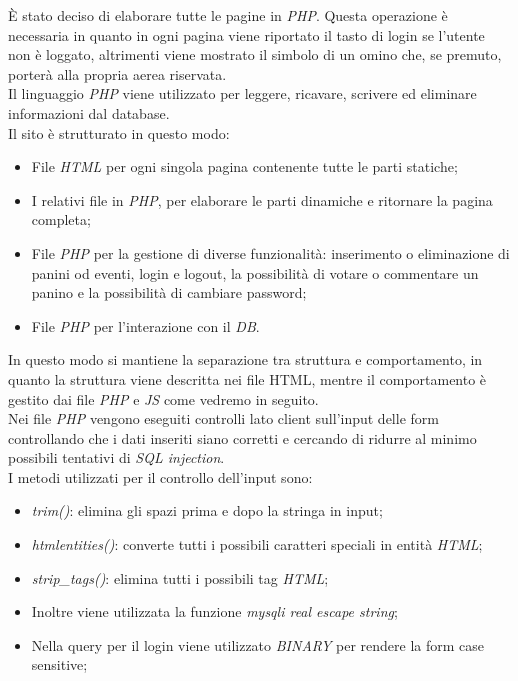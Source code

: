 È stato deciso di elaborare tutte le pagine in \emph{PHP}. 
Questa operazione è necessaria in quanto in ogni 
pagina viene riportato il tasto di login se l'utente non è loggato, altrimenti viene mostrato il simbolo di un omino che, se premuto, porterà alla propria aerea riservata.\\
Il linguaggio \emph{PHP} viene utilizzato per leggere, ricavare, scrivere ed eliminare informazioni dal database.\\
Il sito è strutturato in questo modo: 
\begin{itemize}
    \item File \emph{HTML} per ogni singola pagina contenente tutte le parti statiche;
    \item I relativi file in \emph{PHP}, per elaborare le parti dinamiche e ritornare la pagina completa;
    \item File \emph{PHP} per la gestione di diverse funzionalità: inserimento o eliminazione di panini od eventi, login e logout, la possibilità di votare o commentare un panino e la possibilità di cambiare password;
    \item File \emph{PHP} per l'interazione con il \emph{DB}.
\end{itemize}
In questo modo si mantiene la separazione tra struttura e comportamento, in quanto la struttura viene descritta nei file HTML, mentre il comportamento è gestito dai file \emph{PHP} e \emph{JS} come vedremo in seguito.\\

Nei file \emph{PHP} vengono eseguiti controlli lato client sull'input delle form controllando che i dati inseriti siano corretti e cercando di ridurre al minimo possibili tentativi di \emph{SQL injection}.\\
I metodi utilizzati per il controllo dell'input sono: 
    \begin{itemize}
        \item \emph{trim()}: elimina gli spazi prima e dopo la stringa in input;
        \item \emph{htmlentities()}: converte tutti i possibili caratteri speciali in entità \emph{HTML};
        \item \emph{strip\_tags()}: elimina tutti i possibili tag \emph{HTML};
        \item Inoltre viene utilizzata la funzione \emph{mysqli real escape string};
        \item Nella query per il login viene utilizzato \emph{BINARY} per rendere la form case sensitive;
    \end{itemize}